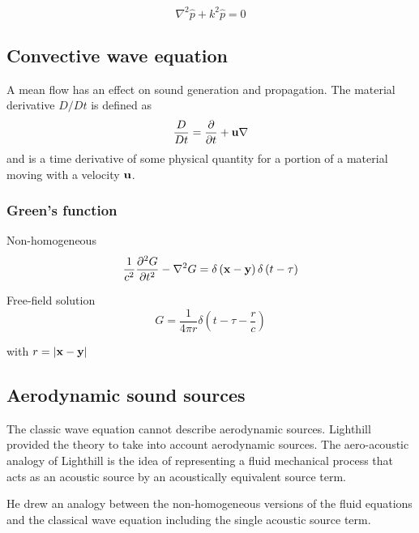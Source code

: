 \begin{equation}\label{eq:theory:sound:wave:helmholtz}
 \nabla^2 \hat{p} + k^2 \hat{p} = 0
\end{equation}


\subsection{Convective wave equation}
A mean flow has an effect on sound generation and propagation.
The material derivative $D/Dt$ is defined as
\begin{equation}
  \frac{D}{Dt} = \frac{\partial}{\partial t} + \mathbf{u} \nabla
\end{equation}
and is a time derivative of some physical quantity for a portion of a material moving with a velocity $\mathbf{u}$.





\subsubsection*{Green's function}\label{sec:theory:sound:green}
%
Non-homogeneous
\begin{equation}
\frac{1}{c^2}\frac{\partial^2 G}{\partial t^2} - \nabla^2 G = \delta \left( \mathbf{x} - \mathbf{y} \right) \delta \left(t - \tau \right)
\end{equation}

Free-field solution
\begin{equation}
 G = \frac{1}{4 \pi r} \delta \left( t - \tau - \frac{r}{c} \right)
\end{equation}

with $r = \left| \mathbf{x} - \mathbf{y} \right|$


\subsection{Aerodynamic sound sources}\label{sec:theory:sound:aerodynamic}
The classic wave equation cannot describe aerodynamic sources. Lighthill
provided the theory to take into account aerodynamic sources. The aero-acoustic
analogy of Lighthill is the idea of representing a fluid mechanical process that
acts as an acoustic source by an acoustically equivalent source term.

He drew an analogy
between the non-homogeneous versions of the fluid equations and the classical
wave equation including the single acoustic source term.

